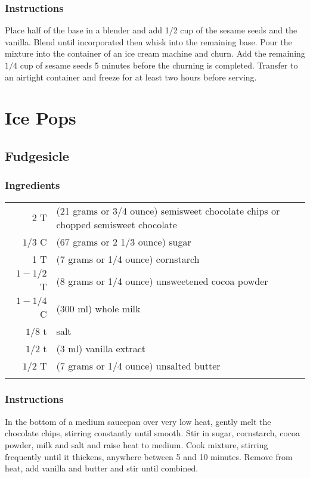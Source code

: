 \documentclass[12pt,landscape,twoside,twocolumn, openright, titlepage, draft]{book}
\begin{document}
\subsubsection{Instructions}
Place half of the base in a blender and add 1/2 cup of the sesame seeds and the vanilla. Blend until incorporated then whisk into the remaining base. Pour the mixture into the container of an ice cream machine and churn. Add the remaining $1/4$ cup of sesame seeds 5 minutes before the churning is completed. Transfer to an airtight container and freeze for at least two hours before serving.

\section{Ice Pops}
\subsection{Fudgesicle}
\subsubsection{Ingredients}
\begin{tabular}{r p{1.5in}}
  2 T       & (21 grams or 3/4 ounce) semisweet chocolate chips or chopped semisweet chocolate \\
  $1/3$ C   & (67 grams or 2 1/3 ounce) sugar \\
  1 T       & (7 grams or 1/4 ounce) cornstarch \\
  $1-1/2$ T & (8 grams or 1/4 ounce) unsweetened cocoa powder \\
  $1-1/4$ C & (300 ml) whole milk \\
  $1/8$ t   & salt \\
  $1/2$ t   & (3 ml) vanilla extract \\
  $1/2$ T   & (7 grams or 1/4 ounce) unsalted butter \\ \\
\end{tabular}

\subsubsection{Instructions}
In the bottom of a medium saucepan over very low heat, gently melt the chocolate chips, stirring constantly until smooth. Stir in sugar, cornstarch, cocoa powder, milk and salt and raise heat to medium. Cook mixture, stirring frequently until it thickens, anywhere between 5 and 10 minutes. Remove from heat, add vanilla and butter and stir until combined.
\end{document}
